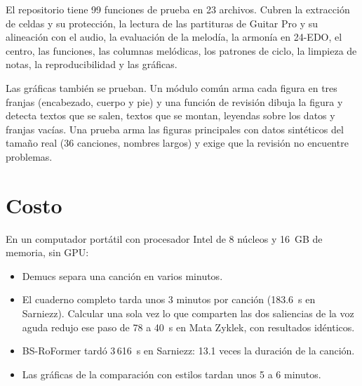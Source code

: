 El repositorio tiene 99 funciones de prueba en 23 archivos. Cubren la extracción de celdas y su protección, la lectura de
las partituras de Guitar Pro y su alineación con el audio, la evaluación de la melodía, la armonía en 24-EDO, el centro,
las funciones, las columnas melódicas, los patrones de ciclo, la limpieza de notas, la reproducibilidad y las gráficas.

Las gráficas también se prueban. Un módulo común arma cada figura en tres franjas (encabezado, cuerpo y pie) y una función
de revisión dibuja la figura y detecta textos que se salen, textos que se montan, leyendas sobre los datos y franjas
vacías. Una prueba arma las figuras principales con datos sintéticos del tamaño real (36 canciones, nombres largos) y exige
que la revisión no encuentre problemas.

\section{Costo}

En un computador portátil con procesador Intel de 8 núcleos y 16~GB de memoria, sin GPU:
\begin{itemize}
  \item Demucs separa una canción en varios minutos.
  \item El cuaderno completo tarda unos 3 minutos por canción (183.6~s en Sarniezz). Calcular una sola vez lo que comparten
  las dos saliencias de la voz aguda redujo ese paso de 78 a 40~s en Mata Zyklek, con resultados idénticos.
  \item BS-RoFormer tardó 3\,616~s en Sarniezz: 13.1 veces la duración de la canción.
  \item Las gráficas de la comparación con estilos tardan unos 5 a 6 minutos.
\end{itemize}

